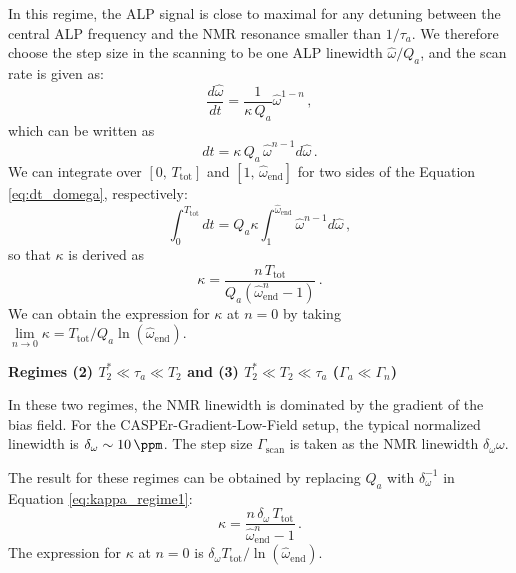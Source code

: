 \documentclass{WileyMSP-template}
\begin{document}
	In this regime, the ALP signal is close to maximal for any detuning between the central ALP frequency and the NMR resonance smaller than $1/\tau_a$.
	We therefore choose the step size in the scanning to be one ALP linewidth $\hat{\omega}/Q_a$, 
	and the scan rate is given as:
	\begin{equation}
		\dfrac{d\hat{\omega}}{dt} = \dfrac{1}{\kappa\,Q_a} \hat{\omega}^{1-n}
		\,,\label{eq:scan_rate_regime1}
	\end{equation}
	which can be written as
	\begin{equation}
		dt = \kappa\,Q_a\, \hat{\omega}^{n-1} d\hat{\omega}
		\,.\label{eq:dt_domega}
	\end{equation}
	We can integrate over $[0,\,T_{\mathrm{tot}}]$ and $[1,\,\hat{\omega}_{\mathrm{end}}]$ for two sides of the Equation \eqref{eq:dt_domega}, respectively:
	\begin{equation}
		\int_{0}^{T_{\mathrm{tot}}} dt = Q_a \kappa 
		\int_{1}^{\hat{\omega}_{\text{end}}} \hat{\omega}^{n-1} d\hat{\omega}
		\,,
	\end{equation}
	so that $\kappa$ is derived as
	\begin{equation}
		\kappa = \dfrac{n\,T_{\mathrm{tot}} }{ Q_a(\hat{\omega}_{\mathrm{end}}^{n}-1 )}  
		\,.\label{eq:kappa_regime1}
	\end{equation}
	We can obtain the expression for $\kappa$ at $n=0$ by taking $\lim\limits_{n\to0}\kappa = T_{\mathrm{tot}}/Q_a \ln(\hat{\omega}_{\mathrm{end}})$. 

	
	
	
	\textbf{Regimes (2) $T_2^* \ll \tau_a \ll T_2 $ and (3) $T_2^* \ll T_2 \ll \tau_a$ ($\Gamma_a\ll\Gamma_n$)}

	
	In these two regimes, the NMR linewidth is dominated by the gradient of the bias field. 
	For the CASPEr-Gradient-Low-Field setup, the typical normalized linewidth is $\delta_{\omega}\sim \SI{10}{\ppm}$. The step size $\Gamma_{\mathrm{scan}}$ is taken as the NMR linewidth $\delta_{\omega} \omega$.

	
	The result for these regimes can be obtained by replacing $Q_a$ with $\delta_\omega^{-1}$ in Equation \eqref{eq:kappa_regime1}:
	\begin{equation}
		\kappa = \dfrac{n \,\delta_\omega\,T_{\mathrm{tot}} }{ \hat{\omega}_{\mathrm{end}}^{n}-1 }
		\,.\label{eq:kappa_regime2and3}
	\end{equation}
	The expression for $\kappa$ at $n=0$ is $\delta_\omega T_{\mathrm{tot}} / \ln(\hat{\omega}_{\mathrm{end}})$. 
\end{document}

